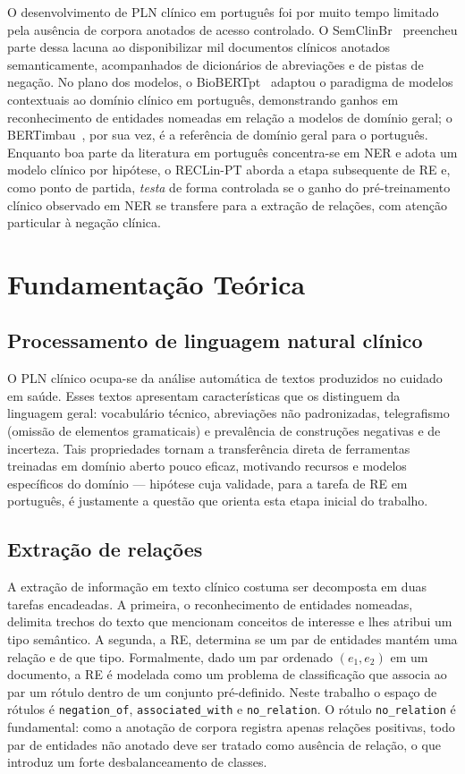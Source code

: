\documentclass[12pt]{article}
\begin{document}
O desenvolvimento de PLN clínico em português foi por muito tempo limitado pela
ausência de corpora anotados de acesso controlado. O SemClinBr~\cite{oliveira:22}
preencheu parte dessa lacuna ao disponibilizar mil documentos clínicos anotados
semanticamente, acompanhados de dicionários de abreviações e de pistas de
negação. No plano dos modelos, o BioBERTpt~\cite{schneider:20} adaptou o
paradigma de modelos contextuais ao domínio clínico em português, demonstrando
ganhos em reconhecimento de entidades nomeadas em relação a modelos de domínio
geral; o BERTimbau~\cite{souza:20}, por sua vez, é a referência de domínio geral
para o português. Enquanto boa parte da literatura em português concentra-se em
NER e adota um modelo clínico por hipótese, o RECLin-PT aborda a etapa subsequente
de RE e, como ponto de partida, \emph{testa} de forma controlada se o ganho do
pré-treinamento clínico observado em NER se transfere para a extração de relações,
com atenção particular à negação clínica.

\section{Fundamentação Teórica}\label{sec:fund}

\subsection{Processamento de linguagem natural clínico}
O PLN clínico ocupa-se da análise automática de textos produzidos no cuidado em
saúde. Esses textos apresentam características que os distinguem da linguagem
geral: vocabulário técnico, abreviações não padronizadas, telegrafismo (omissão
de elementos gramaticais) e prevalência de construções negativas e de incerteza.
Tais propriedades tornam a transferência direta de ferramentas treinadas em
domínio aberto pouco eficaz, motivando recursos e modelos específicos do
domínio --- hipótese cuja validade, para a tarefa de RE em português, é
justamente a questão que orienta esta etapa inicial do trabalho.

\subsection{Extração de relações}
A extração de informação em texto clínico costuma ser decomposta em duas tarefas
encadeadas. A primeira, o reconhecimento de entidades nomeadas, delimita trechos
do texto que mencionam conceitos de interesse e lhes atribui um tipo semântico.
A segunda, a RE, determina se um par de entidades mantém uma relação e de que
tipo. Formalmente, dado um par ordenado $(e_1, e_2)$ em um documento, a RE é
modelada como um problema de classificação que associa ao par um rótulo dentro
de um conjunto pré-definido. Neste trabalho o espaço de rótulos é
\texttt{negation\_of}, \texttt{associated\_with} e \texttt{no\_relation}. O
rótulo \texttt{no\_relation} é fundamental: como a anotação de corpora registra
apenas relações positivas, todo par de entidades não anotado deve ser tratado
como ausência de relação, o que introduz um forte desbalanceamento de classes.
\end{document}
